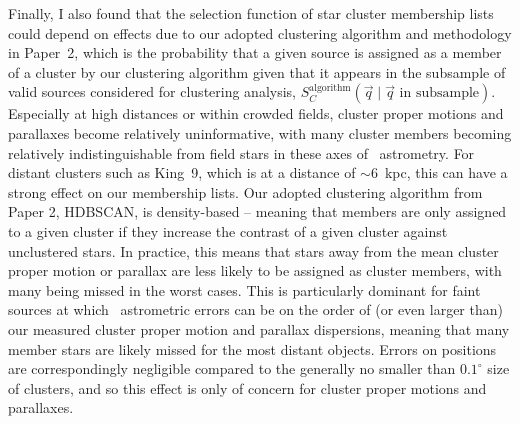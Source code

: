 Finally, I also found that the selection function of star cluster membership lists could depend on effects due to our adopted clustering algorithm and methodology in Paper~2, which is the probability that a given source is assigned as a member of a cluster by our clustering algorithm given that it appears in the subsample of valid sources considered for clustering analysis, $S_C^\text{algorithm}(\vec{q} \mid \vec{q}\text{ in subsample})$. Especially at high distances or within crowded fields, cluster proper motions and parallaxes become relatively uninformative, with many cluster members becoming relatively indistinguishable from field stars in these axes of \gaia\ astrometry. For distant clusters such as King~9, which is at a distance of $\sim6$~kpc, this can have a strong effect on our membership lists. Our adopted clustering algorithm from Paper 2, HDBSCAN, is density-based -- meaning that members are only assigned to a given cluster if they increase the contrast of a given cluster against unclustered stars. In practice, this means that stars away from the mean cluster proper motion or parallax are less likely to be assigned as cluster members, with many being missed in the worst cases. This is particularly dominant for faint sources at which \gaia\ astrometric errors can be on the order of (or even larger than) our measured cluster proper motion and parallax dispersions, meaning that many member stars are likely missed for the most distant objects. Errors on positions are correspondingly negligible compared to the generally no smaller than $0.1^\circ$ size of clusters, and so this effect is only of concern for cluster proper motions and parallaxes.

